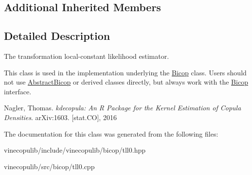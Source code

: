 \subsection*{Additional Inherited Members}


\subsection{Detailed Description}
The transformation local-\/constant likelihood estimator. 

This class is used in the implementation underlying the \hyperlink{classvinecopulib_1_1_bicop}{Bicop} class. Users should not use \hyperlink{classvinecopulib_1_1_abstract_bicop}{Abstract\+Bicop} or derived classes directly, but always work with the \hyperlink{classvinecopulib_1_1_bicop}{Bicop} interface.

Nagler, Thomas. {\itshape kdecopula\+: An R Package for the Kernel Estimation of Copula Densities}. ar\+Xiv\+:1603. \mbox{[}stat.\+C\+O\mbox{]}, 2016 

The documentation for this class was generated from the following files\+:\begin{DoxyCompactItemize}
\item 
vinecopulib/include/vinecopulib/bicop/tll0.\+hpp\item 
vinecopulib/src/bicop/tll0.\+cpp\end{DoxyCompactItemize}

